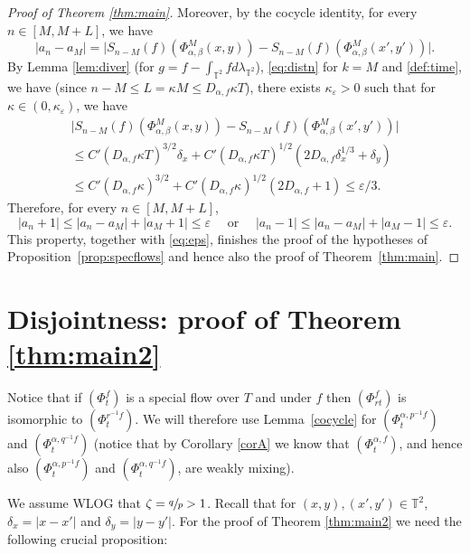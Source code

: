 \documentclass[JEP,XML,SOM,Unicode,NoEqCountersInSection]{cedram}
\let\epsilon\varepsilon
\theoremstyle{definition}
\theoremstyle{plain}
\newcommand\TT{\mathbb{T}}
\begin{document}
\begin{proof}[Proof of Theorem \ref{thm:main}]
Moreover, by the cocycle identity, for every $n\in [M,M+L]$, we have
\[
|a_n-a_M|=\bigl|S_{n-M}(f)(\Phi_{\alpha,\beta}^M(x,y))-S_{n-M}(f)(\Phi_{\alpha,\beta}^M(x',y'))\bigr|.
\]
By Lemma \ref{lem:diver} (for $g=f-\int_{\TT^2}f d\lambda_{\TT^2}$), \eqref{eq:distn} for $k=M$ and \eqref{def:time}, we have (since $n-M\leq L=\kappa M\leq D_{\alpha,f}\kappa T$),
there exists $\kappa_\epsilon>0$ such that for $\kappa\in (0, \kappa_\epsilon)$, we have
\begin{multline*}
\bigl|S_{n-M}(f)(\Phi_{\alpha,\beta}^M(x,y))-S_{n-M}(f)(\Phi_{\alpha,\beta}^M(x',y'))\bigl|\\
\leq C'(D_{\alpha,f}\kappa T)^{3/2}\delta_x+ C'(D_{\alpha,f}\kappa T)^{1/2}(2D_{\alpha,f}\delta_x^{1/3}+\delta_y)\\
\leq
C'(D_{\alpha,f}\kappa)^{3/2}+C'(D_{\alpha,f}\kappa)^{1/2}(2D_{\alpha,f}+1)\leq \epsilon/3.
\end{multline*}
Therefore, for every $n\in [M,M+L]$,
\[
|a_n + 1|\leq |a_n-a_M|+|a_M+ 1|\leq \epsilon \quad \text{ or } \quad |a_n - 1|\leq |a_n-a_M|+|a_M- 1| \leq \epsilon.
\]
This property, together with \eqref{eq:eps}, finishes the proof of the hypotheses of Proposition~\ref{prop:specflows} and hence also the proof of Theorem~\ref{thm:main}.
\end{proof}

\section{Disjointness: proof of Theorem \ref{thm:main2}}\label{sec:proof2}
Notice that if $(\Phi_t^f)$ is a special flow over $T$ and under $f$ then $(\Phi_{rt}^f)$ is isomorphic to $(\Phi_t^{r^{-1}f})$. We will therefore use Lemma~\ref{cocycle} for
$(\Phi_t^{\alpha,p^{-1}f})$ and $(\Phi_t^{\alpha,q^{-1}f})$ (notice that by Corollary \ref{corA} we know that $(\Phi_t^{\alpha,f})$, and hence also $(\Phi_t^{\alpha,p^{-1}f})$ and $(\Phi_t^{\alpha,q^{-1}f})$, are weakly mixing).

We assume WLOG that $\zeta=\sfrac{q}{p}>1$. Recall that for $(x,y),(x',y')\in \TT^2$, \hbox{$\delta_x=\vert x-x'\vert$} and $\delta_y=\vert y-y'\vert$. For the proof of Theorem \ref{thm:main2} we need the following crucial proposition:
\end{document}
